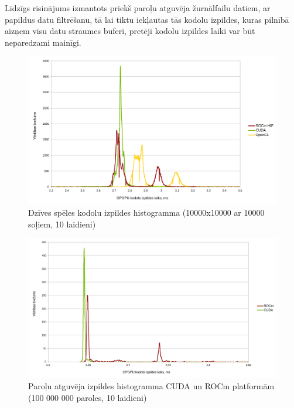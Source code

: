 Līdzīgs risinājums izmantots priekš paroļu atguvēja žurnālfailu datiem, ar
papildus datu filtrēšanu, tā lai tiktu iekļautas tās kodolu izpildes, kuras
pilnībā aizņem visu datu straumes buferi, pretēji kodolu izpildes laiki var būt
neparedzami mainīgi.

\begin{figure}[H]
    \centering
    \includegraphics[width=\textwidth]{images/gol_distrib.png}
    \caption{Dzīves spēles kodolu izpildes histogramma (10000x10000 ar 10000 soļiem, 10 laidieni)}
    \label{img:gol_distrib}
\end{figure}


\begin{figure}[H] \centering
    \includegraphics[width=\textwidth]{images/sha_distrib_cuda_rocm.png}
    \caption{Paroļu atguvēja izpildes histogramma CUDA un ROCm platformām (100
    000 000 paroles, 10 laidieni)} \label{img:sha_distrib}
\end{figure}


